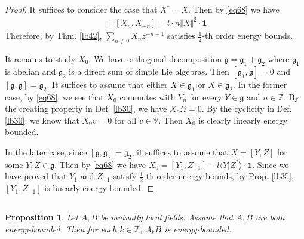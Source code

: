 \documentclass[12pt,b5paper,notitlepage]{article}
\theoremstyle{definition}
\theoremstyle{plain}
\newtheorem{pp}[df]{Proposition}
\newcommand{\idt}{\mathbf{1}}
\newcommand{\bk}[1]{\langle {#1}\rangle}
\newcommand{\gk}{\mathfrak g}
\newcommand{\Vbb}{\mathbb V}
\newcommand{\Zbb}{\mathbb Z}
\numberwithin{equation}{section}
\begin{document}
\begin{proof}
It suffices to consider the case that $X^\dagger=X$. Then by \eqref{eq68} we have
\begin{align*}
[X_n,X_n^\dagger]=[X_n,X_{-n}]=l\cdot n \Vert X\Vert^2\cdot \idt
\end{align*}
Therefore, by Thm. \ref{lb42}, $\sum_{n\neq 0}X_nz^{-n-1}$ satisfies $\frac 12$-th order energy bounds. 

It remains to study $X_0$. We have orthogonal decomposition $\gk=\gk_1+\gk_2$ where $\gk_1$ is abelian and $\gk_2$ is a direct sum of simple Lie algebras. Then $[\gk_1,\gk]=0$ and $[\gk,\gk]=\gk_2$. It suffices to assume that either $X\in \gk_1$ or $X\in\gk_2$. In the former case, by \eqref{eq68}, we see that $X_0$ commutes with $Y_n$ for every $Y\in\gk$ and $n\in\Zbb$. By the creating property in Def. \ref{lb30}, we have $X_0\Omega=0$. By the cyclicity in Def. \ref{lb30}, we know that $X_0v=0$ for all $v\in\Vbb$. Then $X_0$ is clearly linearly energy bounded.

In the later case, since $[\gk,\gk]=\gk_2$, it suffices to assume that $X=[Y,Z]$ for some $Y,Z\in\gk$. Then by \eqref{eq68} we have $X_0=[Y_1,Z_{-1}]-l\bk{Y|Z^*}\cdot\idt$. Since we have proved that $Y_1$ and $Z_{-1}$ satisfy $\frac 12$-th order energy bounds, by Prop. \ref{lb35}, $[Y_1,Z_{-1}]$ is linearly energy-bounded.
\end{proof}



\subsection{}

\begin{pp}
Let $A,B$ be mutually local fields. Assume that $A,B$ are both energy-bounded. Then for each $k\in\Zbb$, $A_kB$ is energy-bounded.
\end{pp}
\end{document}
